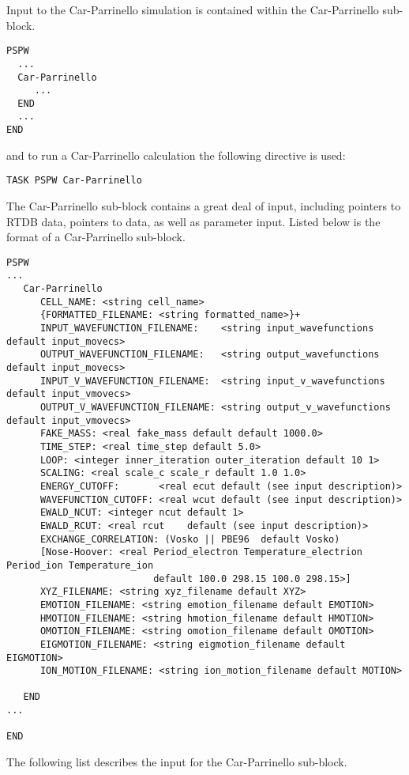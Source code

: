   Input to the Car-Parrinello 
simulation is contained within the Car-Parrinello sub-block.
\begin{verbatim}
PSPW
  ...
  Car-Parrinello
     ...
  END
  ...
END
\end{verbatim}
and to run a Car-Parrinello calculation the following directive is used:
\begin{verbatim}
TASK PSPW Car-Parrinello 
\end{verbatim}
The Car-Parrinello sub-block contains a great deal
of input, including pointers to RTDB data, pointers to data, as well as
parameter input.  Listed below is the format of a Car-Parrinello sub-block.
\begin{verbatim}
PSPW
...
   Car-Parrinello
      CELL_NAME: <string cell_name>
      {FORMATTED_FILENAME: <string formatted_name>}+
      INPUT_WAVEFUNCTION_FILENAME:    <string input_wavefunctions    default input_movecs>
      OUTPUT_WAVEFUNCTION_FILENAME:   <string output_wavefunctions   default input_movecs>
      INPUT_V_WAVEFUNCTION_FILENAME:  <string input_v_wavefunctions  default input_vmovecs>
      OUTPUT_V_WAVEFUNCTION_FILENAME: <string output_v_wavefunctions default input_vmovecs>
      FAKE_MASS: <real fake_mass default default 1000.0>
      TIME_STEP: <real time_step default 5.0>
      LOOP: <integer inner_iteration outer_iteration default 10 1>
      SCALING: <real scale_c scale_r default 1.0 1.0>
      ENERGY_CUTOFF:       <real ecut default (see input description)>
      WAVEFUNCTION_CUTOFF: <real wcut default (see input description)>
      EWALD_NCUT: <integer ncut default 1>
      EWALD_RCUT: <real rcut    default (see input description)>
      EXCHANGE_CORRELATION: (Vosko || PBE96  default Vosko)
      [Nose-Hoover: <real Period_electron Temperature_electrion Period_ion Temperature_ion 
                          default 100.0 298.15 100.0 298.15>]
      XYZ_FILENAME: <string xyz_filename default XYZ>
      EMOTION_FILENAME: <string emotion_filename default EMOTION>
      HMOTION_FILENAME: <string hmotion_filename default HMOTION>
      OMOTION_FILENAME: <string omotion_filename default OMOTION>
      EIGMOTION_FILENAME: <string eigmotion_filename default EIGMOTION>
      ION_MOTION_FILENAME: <string ion_motion_filename default MOTION>

   END
...

END
\end{verbatim}
The following list describes the input for the Car-Parrinello
sub-block.
